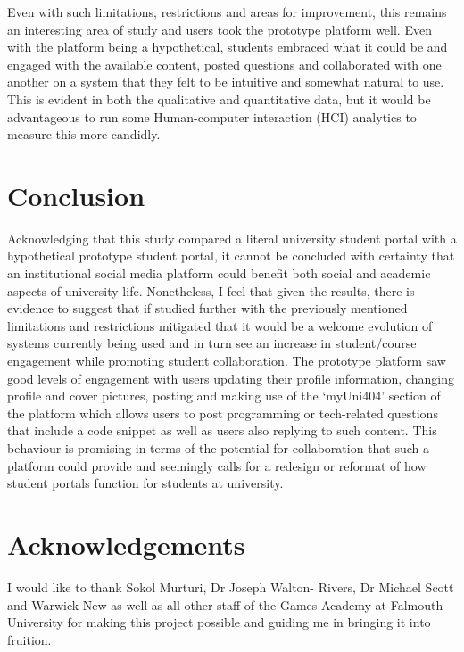 \documentclass[lettersize,journal]{IEEEtran}
\begin{document}
	Even with such limitations, restrictions and areas for improvement, this remains an interesting area of study and users took the prototype platform well. Even with the platform being a
	hypothetical, students embraced what it could be and engaged with the available content, posted questions and collaborated with one another on a system that they felt to be intuitive and
	somewhat natural to use. This is evident in both the qualitative and quantitative data, but it would be advantageous to run some Human-computer interaction (HCI) analytics to measure
	this more candidly.


\section{Conclusion}
	Acknowledging that this study compared a literal university student portal with a hypothetical prototype student portal, it cannot be concluded with certainty that an institutional
	social media platform could benefit both social and academic aspects of university life. Nonetheless, I feel that given the results, there is evidence to suggest that if studied further 
	with the previously mentioned limitations and restrictions mitigated that it would be a welcome evolution of systems currently being used and in turn see an increase in student/course engagement
	while promoting student collaboration.
	The prototype platform saw good levels of engagement with users updating their profile information, changing profile and cover pictures, posting and making use of the `myUni404' section of the
	platform which allows users to post programming or tech-related questions that include a code snippet as well as users also replying to such content. This behaviour is promising in terms of the 
	potential for collaboration that such a platform could provide and seemingly calls for a redesign or reformat of how student portals function for students at university.

\section{Acknowledgements}
I would like to thank Sokol Murturi, Dr Joseph Walton-
Rivers, Dr Michael Scott and Warwick New as well as all
other staff of the Games Academy at Falmouth University for
making this project possible and guiding me in bringing it into
fruition. 
\end{document}
